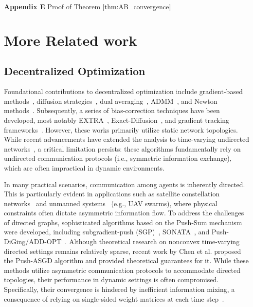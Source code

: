 \documentclass{article}
\theoremstyle{plain}
\theoremstyle{definition}
\theoremstyle{remark}
\begin{document}
\noindent \textbf{Appendix E} \quad Proof of Theorem \ref{thm:AB_convergence} \dotfill \pageref{app:proof_ab} \\

\hrulefill 

\bigskip



\section{More Related work} 
\label{app:related_more}

\subsection{Decentralized Optimization} 
\label{app:decentralized_opt}
Foundational contributions to decentralized optimization include gradient-based methods~\cite{nedic2009,YuanDGD2015}, diffusion strategies~\cite{ChenDiffusion2012}, dual averaging~\cite{DuchiDual2012}, ADMM~\cite{ShiADMM2014}, and Newton methods~\cite{MokhtariNewton2017, VaragnoloNewton2016}. Subsequently, a series of bias-correction techniques have been developed, most notably EXTRA~\cite{Shi2015extra}, Exact-Diffusion~\cite{YanD22019,YuanED2023}, and gradient tracking frameworks~\cite{KoloskovaGT2021, PuSGT2021}. 
However, these works primarily utilize static network topologies. While recent advancements have extended the analysis to time-varying undirected networks~\cite{KovalevTV2021,kovalev2024lower,LiTV2024}, a critical limitation persists: these algorithms fundamentally rely on undirected communication protocols (i.e., symmetric information exchange), which are often impractical in dynamic environments.

In many practical scenarios, communication among agents is inherently directed. This is particularly evident in applications such as satellite constellation networks~\cite{KaushalSatellite2017,HanSatellite2023} and unmanned systems~\cite{WeiUAV2005,dasMARL2019,GaydamakaUAV2024} (e.g., UAV swarms), where physical constraints often dictate asymmetric information flow.
To address the challenges of directed graphs, sophisticated algorithms based on the Push-Sum mechanism~\cite{TsianosPushsum2012} were developed, including subgradient-push (SGP)~\cite{Nedic2015tvpushgd,AssranSGP2019}, SONATA~\cite{TianSONATA2020}, and Push-DiGing/ADD-OPT~\cite{nedicdiging2017,XiAddopt2018}. Although theoretical research on nonconvex time-varying directed settings remains relatively sparse, recent work by Chen et al.  proposed the Push-ASGD algorithm and provided theoretical guarantees for it. While these methods utilize asymmetric communication protocols to accommodate directed topologies, their performance in dynamic settings is often compromised. Specifically, their convergence is hindered by inefficient information mixing, a consequence of relying on single-sided weight matrices at each time step~\cite{Nedic2025tvd}.
\end{document}
